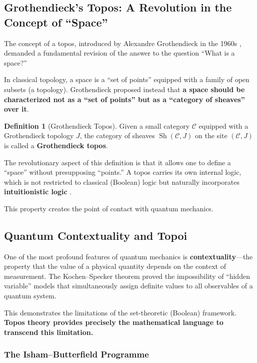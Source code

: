 \documentclass[12pt,a4paper]{article}
\theoremstyle{definition}
\newtheorem{definition}{Definition}[section]
\newcommand{\Sh}{\operatorname{Sh}}
\begin{document}
\subsection{Grothendieck's Topos: A Revolution in the Concept of ``Space''}

The concept of a topos, introduced by Alexandre Grothendieck in the 1960s \cite{SGA4, Grothendieck1957}, demanded a fundamental revision of the answer to the question ``What is a space?''

In classical topology, a space is a ``set of points'' equipped with a family of open subsets (a topology). Grothendieck proposed instead that \textbf{a space should be characterized not as a ``set of points'' but as a ``category of sheaves'' over it}.

\begin{definition}[Grothendieck Topos]
Given a small category $\mathcal{C}$ equipped with a Grothendieck topology $J$, the category of sheaves $\Sh(\mathcal{C}, J)$ on the site $(\mathcal{C}, J)$ is called a \textbf{Grothendieck topos}.
\end{definition}

The revolutionary aspect of this definition is that it allows one to define a ``space'' without presupposing ``points.'' A topos carries its own internal logic, which is not restricted to classical (Boolean) logic but naturally incorporates \textbf{intuitionistic logic} \cite{MacLaneMoerdijk1992, Johnstone2002}.

This property creates the point of contact with quantum mechanics.

\subsection{Quantum Contextuality and Topoi}

One of the most profound features of quantum mechanics is \textbf{contextuality}---the property that the value of a physical quantity depends on the context of measurement. The Kochen--Specker theorem \cite{KochenSpecker1967} proved the impossibility of ``hidden variable'' models that simultaneously assign definite values to all observables of a quantum system.

This demonstrates the limitations of the set-theoretic (Boolean) framework. \textbf{Topos theory provides precisely the mathematical language to transcend this limitation.}

\subsubsection{The Isham--Butterfield Programme}
\end{document}
